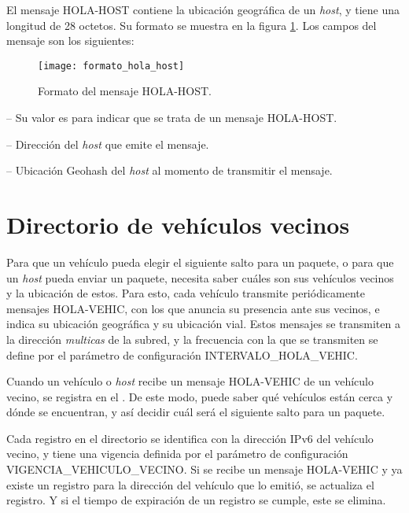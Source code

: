 El mensaje HOLA-HOST contiene la ubicación geográfica de un \textit{host}, y
tiene una longitud de 28 octetos. Su formato se muestra en la figura
\ref{fig:formato_hola_host}. Los campos del mensaje son los siguientes:

\begin{figure}[th!]
\centering
\texttt{[image: formato\_hola\_host]}
\decoRule
\caption[Formato del mensaje HOLA-HOST]{Formato del mensaje HOLA-HOST.}
\label{fig:formato_hola_host}
\end{figure}

 -- Su valor es  para indicar que se trata de un
mensaje HOLA-HOST.

 -- Dirección del \textit{host} que emite el
mensaje.

 -- Ubicación Geohash del \textit{host} al
momento de transmitir el mensaje.

\section{Directorio de vehículos vecinos}
\label{sec:directiorio_vehiculos_vecinos}

\begin{sloppypar}
Para que un vehículo pueda elegir el siguiente salto para un paquete, o para
que un \textit{host} pueda enviar un paquete, necesita saber cuáles son sus
vehículos vecinos y la ubicación de estos. Para esto, cada vehículo transmite
periódicamente mensajes \mbox{HOLA-VEHIC}, con los que anuncia su presencia
ante sus vecinos, e indica su ubicación geográfica y su ubicación vial. Estos
mensajes se transmiten a la dirección \textit{multicas} de la subred, y la
frecuencia con la que se transmiten se define por el parámetro de configuración
\mbox{INTERVALO\_HOLA\_VEHIC}.
\end{sloppypar}

\begin{sloppypar}
Cuando un vehículo o \textit{host} recibe un mensaje \mbox{HOLA-VEHIC} de un
vehículo vecino, se registra en el . De
este modo, puede saber qué vehículos están cerca y dónde se encuentran, y así
decidir cuál será el siguiente salto para un paquete.
\end{sloppypar}

\begin{sloppypar}
Cada registro en el directorio se identifica con la dirección IPv6 del vehículo
vecino, y tiene una vigencia definida por el parámetro de configuración
\mbox{VIGENCIA\_VEHICULO\_VECINO}. Si se recibe un mensaje \mbox{HOLA-VEHIC} y
ya existe un registro para la dirección del vehículo que lo emitió, se actualiza
el registro. Y si el tiempo de expiración de un registro se cumple, este se
elimina.
\end{sloppypar}

